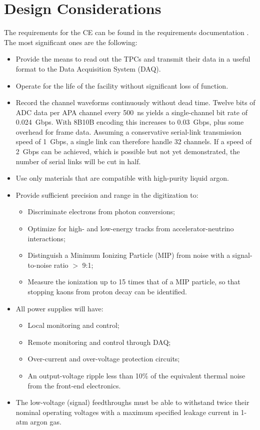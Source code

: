 %
\section{Design Considerations} 
\label{sec:ce_reqs_n_specs}

The requirements for the CE can be found in the requirements documentation \cite{lar-fd-req}.
The most significant ones are the following:

\begin{itemize}	
\item Provide the means to read out the TPCs and transmit their data in a useful format to the Data Acquisition System (DAQ).
\item Operate for the life of the facility without significant loss of function.
\item Record the channel waveforms continuously without dead time.
Twelve bits of ADC data per APA channel every 500~ns yields a single-channel bit rate of 0.024~Gbps.
With 8B10B encoding this increases to 0.03~Gbps, plus some overhead for frame data.
Assuming a conservative serial-link transmission speed of 1~Gbps, a single link can therefore handle 32 channels.
If a speed of 2~Gbps can be achieved, which is possible but not yet demonstrated,
the number of serial links will be cut in half.
\item Use only materials that are compatible with high-purity liquid argon.
\item Provide sufficient precision and range in the digitization to:
\begin{itemize}
\item Discriminate electrons from photon conversions;
\item Optimize for high- and low-energy tracks from accelerator-neutrino interactions;
\item Distinguish a Minimum Ionizing Particle (MIP) from noise with a signal-to-noise ratio $>$ 9:1;
\item Measure the ionization up to 15 times that of a MIP particle, so that stopping kaons from proton decay can be identified.
\end{itemize}
\item All power supplies will have:
\begin{itemize}
\item Local monitoring and control;
\item Remote monitoring and control through DAQ;
\item Over-current and over-voltage protection circuits;
\item An output-voltage ripple less than 10\% of the equivalent thermal noise from the front-end electronics.
\end{itemize}
\item The low-voltage (signal) feedthroughs must be able to withstand twice their nominal operating voltages 
with a maximum specified leakage current in 1-atm argon gas.
\end{itemize}

